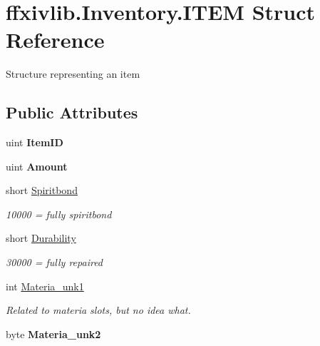 \hypertarget{structffxivlib_1_1_inventory_1_1_i_t_e_m}{\section{ffxivlib.\-Inventory.\-I\-T\-E\-M Struct Reference}
\label{structffxivlib_1_1_inventory_1_1_i_t_e_m}
}


Structure representing an item  


\subsection*{Public Attributes}
\begin{DoxyCompactItemize}
\item 
\hypertarget{structffxivlib_1_1_inventory_1_1_i_t_e_m_ae48153102411b4fedbaf70a3eafa0328}{uint {\bfseries Item\-I\-D}}\label{structffxivlib_1_1_inventory_1_1_i_t_e_m_ae48153102411b4fedbaf70a3eafa0328}

\item 
\hypertarget{structffxivlib_1_1_inventory_1_1_i_t_e_m_a7db1f0e9aee7e558da228d1825c54ce6}{uint {\bfseries Amount}}\label{structffxivlib_1_1_inventory_1_1_i_t_e_m_a7db1f0e9aee7e558da228d1825c54ce6}

\item 
short \hyperlink{structffxivlib_1_1_inventory_1_1_i_t_e_m_afd93b5a4c9e11d131b4157666132b233}{Spiritbond}
\begin{DoxyCompactList}\small\item\em 10000 = fully spiritbond \end{DoxyCompactList}\item 
short \hyperlink{structffxivlib_1_1_inventory_1_1_i_t_e_m_ae3e1f2bfac2b6746e5948e75a5a3b05a}{Durability}
\begin{DoxyCompactList}\small\item\em 30000 = fully repaired \end{DoxyCompactList}\item 
int \hyperlink{structffxivlib_1_1_inventory_1_1_i_t_e_m_aa5184c075480fa32e6c3f7da68811f02}{Materia\-\_\-unk1}
\begin{DoxyCompactList}\small\item\em Related to materia slots, but no idea what. \end{DoxyCompactList}\item 
\hypertarget{structffxivlib_1_1_inventory_1_1_i_t_e_m_a654ff2f382b4780e5dad99ea88329dd4}{byte {\bfseries Materia\-\_\-unk2}}\label{structffxivlib_1_1_inventory_1_1_i_t_e_m_a654ff2f382b4780e5dad99ea88329dd4}


\end{DoxyCompactItemize}

